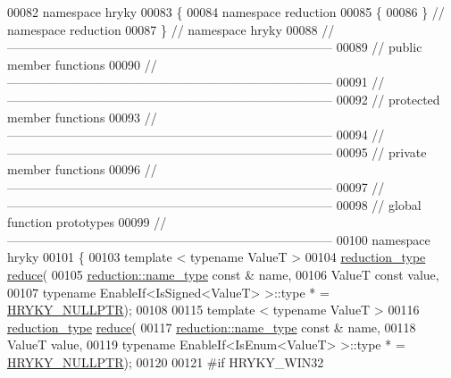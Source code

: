 \begin{DoxyCode}
00082 \textcolor{keyword}{namespace }hryky
00083 \{
00084 \textcolor{keyword}{namespace }reduction
00085 \{
00086 \} \textcolor{comment}{// namespace reduction}
00087 \} \textcolor{comment}{// namespace hryky}
00088 \textcolor{comment}{//
      ------------------------------------------------------------------------------}
00089 \textcolor{comment}{// public member functions}
00090 \textcolor{comment}{//
      ------------------------------------------------------------------------------}
00091 \textcolor{comment}{//
      ------------------------------------------------------------------------------}
00092 \textcolor{comment}{// protected member functions}
00093 \textcolor{comment}{//
      ------------------------------------------------------------------------------}
00094 \textcolor{comment}{//
      ------------------------------------------------------------------------------}
00095 \textcolor{comment}{// private member functions}
00096 \textcolor{comment}{//
      ------------------------------------------------------------------------------}
00097 \textcolor{comment}{//
      ------------------------------------------------------------------------------}
00098 \textcolor{comment}{// global function prototypes}
00099 \textcolor{comment}{//
      ------------------------------------------------------------------------------}
00100 \textcolor{keyword}{namespace }hryky
00101 \{
00103     \textcolor{keyword}{template} < \textcolor{keyword}{typename} ValueT >
00104     \hyperlink{namespacehryky_a343a9a4c36a586be5c2693156200eadc}{reduction_type} \hyperlink{namespacehryky_af41cb3af6766761da0ff21b84527a52c}{reduce}(
00105         \hyperlink{namespacehryky_1_1reduction_ac686c30a4c8d196bbd0f05629a6b921f}{reduction::name_type} \textcolor{keyword}{const} & name,
00106         ValueT \textcolor{keyword}{const} value,
00107         \textcolor{keyword}{typename} EnableIf<IsSigned<ValueT> >::type * = \hyperlink{common_8h_a4cd4ac09cfcdbd6b30ee69afc156e210}{HRYKY_NULLPTR});
00108 
00115     \textcolor{keyword}{template} < \textcolor{keyword}{typename} ValueT >
00116     \hyperlink{namespacehryky_a343a9a4c36a586be5c2693156200eadc}{reduction_type} \hyperlink{namespacehryky_af41cb3af6766761da0ff21b84527a52c}{reduce}(
00117         \hyperlink{namespacehryky_1_1reduction_ac686c30a4c8d196bbd0f05629a6b921f}{reduction::name_type} \textcolor{keyword}{const} & name,
00118         ValueT value,
00119         \textcolor{keyword}{typename} EnableIf<IsEnum<ValueT> >::type * = \hyperlink{common_8h_a4cd4ac09cfcdbd6b30ee69afc156e210}{HRYKY_NULLPTR});
00120 
00121 \textcolor{preprocessor}{#if HRYKY\_WIN32}

\end{DoxyCode}
